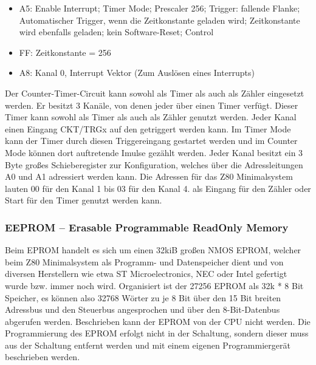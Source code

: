 \begin{itemize}
    \item A5: Enable Interrupt; Timer Mode; Prescaler 256; Trigger: fallende Flanke; Automatischer Trigger, wenn die Zeitkonstante geladen wird; Zeitkonstante wird ebenfalls geladen; kein Software-Reset; Control\\
    \item FF: Zeitkonstante = 256
    \item A8: Kanal 0, Interrupt Vektor (Zum Auslösen eines Interrupts)
\end{itemize}

Der Counter-Timer-Circuit kann sowohl als Timer als auch als Zähler eingesetzt werden. Er besitzt 3 Kanäle, von denen jeder über einen Timer verfügt. Dieser Timer kann sowohl als Timer als auch als Zähler genutzt werden. Jeder Kanal einen Eingang CKT/TRGx auf den getriggert werden kann. Im Timer Mode kann der Timer durch diesen Triggereingang gestartet werden und im Counter Mode können dort auftretende Imulse gezählt werden. Jeder Kanal besitzt ein 3 Byte großes Schieberegister zur Konfiguration, welches über die Adressleitungen A0 und A1 adressiert werden kann. Die Adressen für das Z80 Minimalsystem lauten 00 für den Kanal 1 bis 03 für den Kanal 4. als Eingang für den Zähler oder Start für den Timer genutzt werden kann.

\subsubsection{EEPROM -- Erasable Programmable ReadOnly Memory}

Beim EPROM handelt es sich um einen 32kiB großen NMOS EPROM, welcher beim Z80 Minimalsystem als Programm- und Datenspeicher dient und von diversen Herstellern wie etwa ST Microelectronics, NEC oder Intel gefertigt wurde bzw. immer noch wird. Organisiert ist der 27256 EPROM als 32k * 8 Bit Speicher, es können also 32768 Wörter zu je 8 Bit über den 15 Bit breiten Adressbus und den Steuerbus angesprochen und über den 8-Bit-Datenbus abgerufen werden. Beschrieben kann der EPROM von der CPU nicht werden. Die Programmierung des EPROM erfolgt nicht in der Schaltung, sondern dieser muss aus der Schaltung entfernt werden und mit einem eigenen Programmiergerät beschrieben werden.

